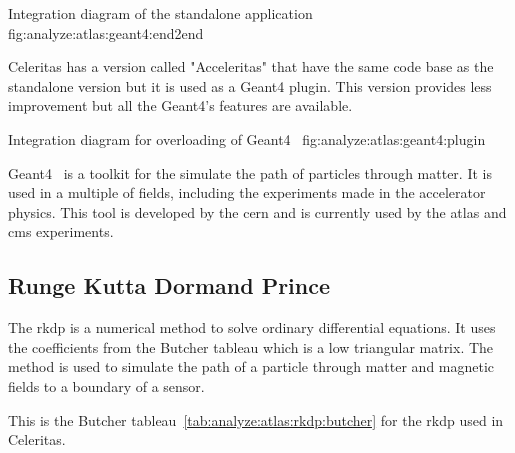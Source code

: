 {Integration diagram of the standalone application~\cite{celeritas-overview-tognini}}
{fig:analyze:atlas:geant4:end2end}


Celeritas has a version called "Acceleritas" that have the same code base as the
standalone version but it is used as a Geant4 plugin.
This version provides less improvement but all the Geant4's features are available.

    {Integration diagram for overloading of Geant4~\cite{celeritas-overview-tognini}}
    {fig:analyze:atlas:geant4:plugin}

Geant4~\cite{geant4} is a toolkit for the simulate the path of particles through
matter.
It is used in a multiple of fields, including the experiments made in the
accelerator physics.
This tool is developed by the \acrfull{cern} and is currently used by the
\acrfull{atlas} and \acrfull{cms} experiments.


\subsection{Runge Kutta Dormand Prince}
\label{ch:analyze:atlas:rkdp}

The \acrfull{rkdp} is a numerical method to solve ordinary differential equations.
It uses the coefficients from the Butcher tableau which is a low triangular
matrix.
The method is used to simulate the path of a particle through matter and
magnetic fields to a boundary of a sensor.

This is the Butcher tableau~\ref{tab:analyze:atlas:rkdp:butcher} for the \acrshort{rkdp} used in Celeritas.

